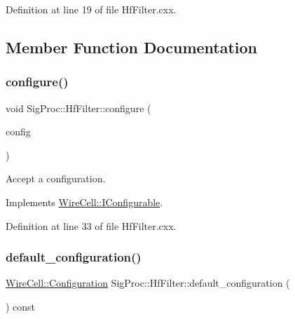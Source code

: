 Definition at line 19 of file Hf\+Filter.\+cxx.



\subsection{Member Function Documentation}
\mbox{\label{class_wire_cell_1_1_sig_proc_1_1_hf_filter_af7320d10ac57a7a3526542a31a393b26}} 
\subsubsection{\texorpdfstring{configure()}{configure()}}
{\footnotesize\ttfamily void Sig\+Proc\+::\+Hf\+Filter\+::configure (\begin{DoxyParamCaption}\item[{const \hyperlink{namespace_wire_cell_a9f705541fc1d46c608b3d32c182333ee}{Wire\+Cell\+::\+Configuration} \&}]{config }\end{DoxyParamCaption})\hspace{0.3cm}{\ttfamily [virtual]}}



Accept a configuration. 



Implements \hyperlink{class_wire_cell_1_1_i_configurable_a57ff687923a724093df3de59c6ff237d}{Wire\+Cell\+::\+I\+Configurable}.



Definition at line 33 of file Hf\+Filter.\+cxx.

\mbox{\label{class_wire_cell_1_1_sig_proc_1_1_hf_filter_a490d55260745515290505cef11ca8ff1}} 
\subsubsection{\texorpdfstring{default\+\_\+configuration()}{default\_configuration()}}
{\footnotesize\ttfamily \hyperlink{namespace_wire_cell_a9f705541fc1d46c608b3d32c182333ee}{Wire\+Cell\+::\+Configuration} Sig\+Proc\+::\+Hf\+Filter\+::default\+\_\+configuration (\begin{DoxyParamCaption}{ }\end{DoxyParamCaption}) const\hspace{0.3cm}{\ttfamily [virtual]}}



